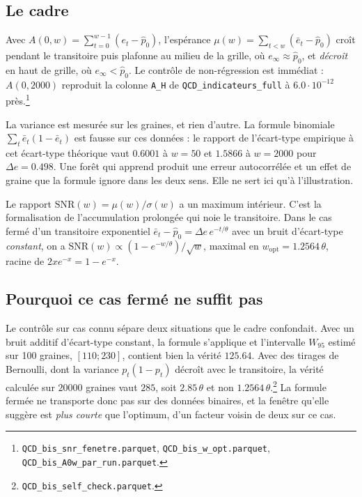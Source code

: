 \documentclass[11pt,a4paper]{article}
\begin{document}
\subsection{Le cadre}

Avec $A(0,w) = \sum_{t=0}^{w-1} (e_t - \hat{p}_0)$, l'espérance
$\mu(w) = \sum_{t<w} (\bar{e}_t - \hat{p}_0)$ croît pendant le transitoire puis plafonne au
milieu de la grille, où $e_\infty \approx \hat{p}_0$, et \emph{décroît} en haut de grille, où
$e_\infty < \hat{p}_0$. Le contrôle de non-régression est immédiat : $A(0,2000)$ reproduit la
colonne \texttt{A\_H} de \texttt{QCD\_indicateurs\_full} à $6.0 \cdot 10^{-12}$
près.\footnote{\texttt{QCD\_bis\_snr\_fenetre.parquet}, \texttt{QCD\_bis\_w\_opt.parquet},
\texttt{QCD\_bis\_A0w\_par\_run.parquet}.}

La variance est mesurée sur les graines, et rien d'autre. La formule binomiale
$\sum_t \bar{e}_t(1-\bar{e}_t)$ est fausse sur ces données : le rapport de l'écart-type
empirique à cet écart-type théorique vaut $0.6001$ à $w = 50$ et $1.5866$ à $w = 2000$ pour
$\Delta e = 0.498$. Une forêt qui apprend produit une erreur autocorrélée et un effet de
graine que la formule ignore dans les deux sens. Elle ne sert ici qu'à l'illustration.

Le rapport $\mathrm{SNR}(w) = \mu(w)/\sigma(w)$ a un maximum intérieur. C'est la
formalisation de l'accumulation prolongée qui noie le transitoire. Dans le cas fermé d'un
transitoire exponentiel $\bar{e}_t - \hat{p}_0 = \Delta e\, e^{-t/\theta}$ avec un bruit
d'écart-type \emph{constant}, on a $\mathrm{SNR}(w) \propto (1 - e^{-w/\theta})/\sqrt{w}$,
maximal en $w_{\mathrm{opt}} = 1.2564\,\theta$, racine de $2x e^{-x} = 1 - e^{-x}$.

\subsection{Pourquoi ce cas fermé ne suffit pas}

Le contrôle sur cas connu sépare deux situations que le cadre confondait. Avec un bruit
additif d'écart-type constant, la formule s'applique et l'intervalle $W_{95}$ estimé sur 100
graines, $[110 ; 230]$, contient bien la vérité $125.64$. Avec des tirages de Bernoulli, dont
la variance $p_t(1-p_t)$ décroît avec le transitoire, la vérité calculée sur $20000$ graines
vaut $285$, soit $2.85\,\theta$ et non
$1.2564\,\theta$.\footnote{\texttt{QCD\_bis\_self\_check.parquet}.} La formule fermée ne
transporte donc pas sur des données binaires, et la fenêtre qu'elle suggère est \emph{plus
courte} que l'optimum, d'un facteur voisin de deux sur ce cas.
\end{document}
